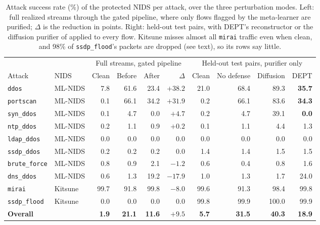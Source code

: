 \documentclass[acmtog,nonacm,pbalance]{acmart}
\newcommand{\src}[1]{\texttt{#1}}
\begin{document}
\begin{table}[t]
  \caption{Attack success rate (\%) of the protected NIDS per attack, over the
  three perturbation modes. Left: full realized streams through the gated
  pipeline, where only flows flagged by the meta-learner are purified; $\Delta$
  is the reduction in points. Right: held-out test pairs, with DEPT's
  reconstructor or the diffusion purifier of \citet{merzouk2024diffusion} applied
  to every flow. Kitsune misses almost all \src{mirai} traffic even when clean, and
  98\% of \src{ssdp\_flood}'s packets are dropped (see text), so its rows say little.}
  \label{tab:e2e}
  \footnotesize
  \setlength{\tabcolsep}{6pt}
  \begin{tabular}{@{}ll rrrr rrrr@{}}
    \toprule
    & & \multicolumn{4}{c}{Full streams, gated pipeline} & \multicolumn{4}{c}{Held-out test pairs, purifier only} \\
    \cmidrule(lr){3-6}\cmidrule(lr){7-10}
    Attack & NIDS & Clean & Before & After & $\Delta$ & Clean & No defense & Diffusion & DEPT \\
    \midrule
    \src{ddos}        & ML-NIDS & 7.8 & 61.6 & 23.4 & $+38.2$ & 21.0 & 68.4 & 89.3 & \textbf{35.7} \\
    \src{portscan}    & ML-NIDS & 0.1 & 66.1 & 34.2 & $+31.9$ & 0.2 & 66.1 & 83.6 & \textbf{34.3} \\
    \src{syn\_ddos}   & ML-NIDS & 0.1 & 4.7 & 0.0 & $+4.7$ & 0.2 & 4.7 & 39.1 & \textbf{0.0} \\
    \src{ntp\_ddos}   & ML-NIDS & 0.2 & 1.1 & 0.9 & $+0.2$ & 0.1 & 1.1 & 4.4 & 1.3 \\
    \src{ldap\_ddos}  & ML-NIDS & 0.0 & 0.0 & 0.0 & $0.0$ & 0.0 & 0.0 & 0.0 & 0.0 \\
    \src{ssdp\_ddos}  & ML-NIDS & 0.2 & 0.2 & 0.2 & $0.0$ & 1.4 & 1.4 & 1.5 & 1.5 \\
    \src{brute\_force}& ML-NIDS & 0.8 & 0.9 & 2.1 & $-1.2$ & 0.6 & 0.4 & 0.8 & 1.6 \\
    \src{dns\_ddos}   & ML-NIDS & 0.6 & 1.3 & 19.2 & $-17.9$ & 1.0 & 1.3 & 1.7 & 24.0 \\
    \src{mirai}       & Kitsune & 99.7 & 91.8 & 99.8 & $-8.0$ & 99.6 & 91.3 & 98.4 & 99.8 \\
    \src{ssdp\_flood} & Kitsune & 0.0 & 0.0 & 0.0 & $0.0$ & 99.8 & 99.9 & 100.0 & 99.9 \\
    \midrule
    \textbf{Overall} & & \textbf{1.9} & \textbf{21.1} & \textbf{11.6} & $\mathbf{+9.5}$ & \textbf{5.7} & \textbf{31.5} & \textbf{40.3} & \textbf{18.9} \\
    \bottomrule
  \end{tabular}
\end{table}
\end{document}
